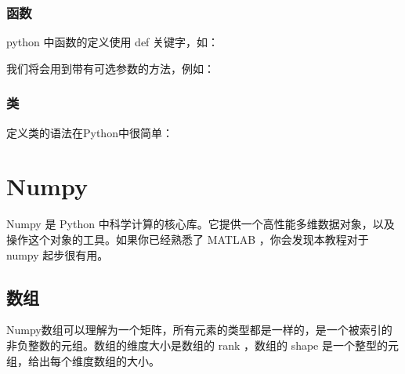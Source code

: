 \documentclass[10pt,a4paper]{article}
\begin{document}
\subsubsection{函数}


python 中函数的定义使用 def 关键字，如：



我们将会用到带有可选参数的方法，例如：



\subsubsection{类}


定义类的语法在Python中很简单：





\section{Numpy}


Numpy 是 Python 中科学计算的核心库。它提供一个高性能多维数据对象，以及操作这个对象的工具。如果你已经熟悉了 MATLAB ，你会发现本教程对于 numpy 起步很有用。

\subsection{数组}

%

Numpy数组可以理解为一个矩阵，所有元素的类型都是一样的，是一个被索引的非负整数的元组。数组的维度大小是数组的 rank ，数组的 shape 是一个整型的元组，给出每个维度数组的大小。
\end{document}
